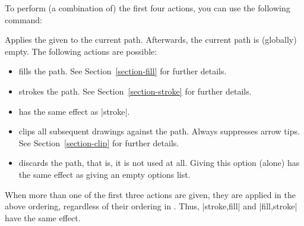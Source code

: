 To perform (a combination of) the first four actions, you can use the following
command:
%
\begin{command}{\pgfusepath{}}
    Applies the given  to the current path. Afterwards, the
    current path is (globally) empty. The following actions are possible:
    \begin{itemize}
        \item {} fills the path. See Section~\ref{section-fill}
            for further details.
\begin{codeexample}[]
\begin{pgfpicture}
  \pgfpathmoveto{\pgfpointorigin}
  \pgfpathlineto{\pgfpoint{1cm}{1cm}}
  \pgfpathlineto{\pgfpoint{1cm}{0cm}}
\end{pgfpicture}
\end{codeexample}
        \item {} strokes the path. See
            Section~\ref{section-stroke} for further details.
\begin{codeexample}[]
\begin{pgfpicture}
  \pgfpathmoveto{\pgfpointorigin}
  \pgfpathlineto{\pgfpoint{1cm}{1cm}}
  \pgfpathlineto{\pgfpoint{1cm}{0cm}}
\end{pgfpicture}
\end{codeexample}
        \item {} has the same effect as |stroke|.
        \item {} clips all subsequent drawings against the path.
            Always suppresses arrow tips. See Section~\ref{section-clip} for
            further details.
\begin{codeexample}[]
\begin{pgfpicture}
  \pgfpathmoveto{\pgfpointorigin}
  \pgfpathlineto{\pgfpoint{1cm}{1cm}}
  \pgfpathlineto{\pgfpoint{1cm}{0cm}}
  \pgfpathcircle{\pgfpoint{1cm}{1cm}}{0.5cm}
\end{pgfpicture}
\end{codeexample}
        \item {} discards the path, that is, it is not used at
            all. Giving this option (alone) has the same effect as giving an
            empty options list.
    \end{itemize}
    When more than one of the first three actions are given, they are applied
    in the above ordering, regardless of their ordering in .
    Thus, |{stroke,fill}| and |{fill,stroke}| have the same effect.
\end{command}

